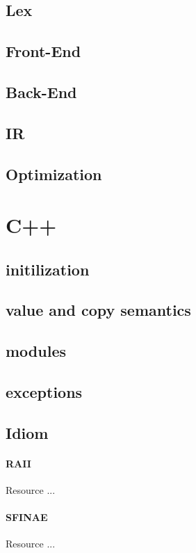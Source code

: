 \documentclass{article}
\begin{document}
\subsection{Lex}
\subsection{Front-End}
\subsection{Back-End}
\subsection{IR}
\subsection{Optimization}
\section{C++}
\subsection{initilization}
\subsection{value and copy semantics}
\subsection{modules}
\subsection{exceptions}
\subsection{Idiom}
\paragraph{RAII} Resource ...
\paragraph{SFINAE} Resource ...
\end{document}

